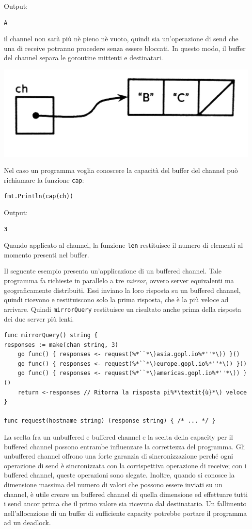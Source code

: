 Output:
\begin{lstlisting}[language=bash, frame=L, label={lst:lstlisting7-4-4.4}]
A
\end{lstlisting}
il channel non sarà più nè pieno nè vuoto, quindi sia un'operazione di send che una di receive potranno procedere senza essere bloccati.
In questo modo, il buffer del channel separa le goroutine mittenti e destinatari.
\begin{center}
    \includegraphics[width=0.5\linewidth]{figures/figure7.4}
\end{center}
Nel caso un programma voglia conoscere la capacità del buffer del channel può richiamare la funzione \verb|cap|:
\begin{lstlisting}[frame=single, label={lst:lstlisting7-4-4.5}]
fmt.Println(cap(ch))
\end{lstlisting}
Output:
\begin{lstlisting}[language=bash, frame=L, label={lst:lstlisting7-4-4.6}]
3
\end{lstlisting}
Quando applicato al channel, la funzione \verb|len| restituisce il numero di elementi al momento presenti nel buffer.

Il seguente esempio presenta un'applicazione di un buffered channel.
Tale programma fa richieste in parallelo a tre \textit{mirror}, ovvero server equivalenti ma geograficamente distribuiti.
Essi inviano la loro risposta su un buffered channel, quindi ricevono e restituiscono solo la prima risposta, che è la più veloce ad arrivare.
Quindi \verb|mirrorQuery| restituisce un risultato anche prima della risposta dei due server più lenti.
\begin{lstlisting}[frame=single, label={lst:lstlisting7-4-4.7}]
func mirrorQuery() string {
responses := make(chan string, 3)
    go func() { responses <- request(%*``*\)asia.gopl.io%*''*\)) }()
    go func() { responses <- request(%*``*\)europe.gopl.io%*''*\)) }()
    go func() { responses <- request(%*``*\)americas.gopl.io%*''*\)) }()
    return <-responses // Ritorna la risposta pi%*\textit{ù}*\) veloce
}

func request(hostname string) (response string) { /* ... */ }
\end{lstlisting}
La scelta fra un unbuffered e buffered channel e la scelta della capacity per il buffered channel possono entrambe influenzare la correttezza del programma.
Gli unbuffered channel offrono una forte garanzia di sincronizzazione perché ogni operazione di send è sincronizzata con la corrispettiva operazione di receive;
con i buffered channel, queste operazioni sono slegate.
Inoltre, quando si conosce la dimensione massima del numero di valori che possono essere inviati su un channel, è utile creare un buffered channel di quella dimensione ed effettuare tutti i send ancor prima che il primo valore sia ricevuto dal destinatario.
Un fallimento nell'allocazione di un buffer di sufficiente capacity potrebbe portare il programma ad un deadlock.